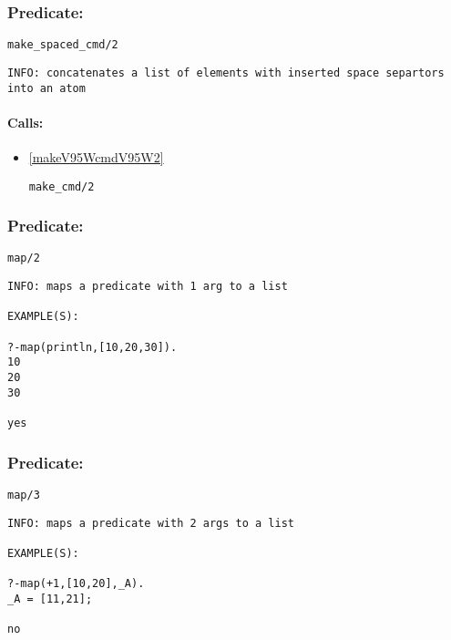 \subsubsection{Predicate:} \label{makeV95WspacedV95WcmdV95W2}

\begin{verbatim}
make_spaced_cmd/2
\end{verbatim}

{\small \begin{verbatim}
INFO: concatenates a list of elements with inserted space separtors into an atom

\end{verbatim}}
\paragraph{Calls:} 
\begin{itemize}
\item \ref{makeV95WcmdV95W2} 
\begin{verbatim}
make_cmd/2
\end{verbatim}

\end{itemize}

\subsubsection{Predicate:} \label{mapV95W2}

\begin{verbatim}
map/2
\end{verbatim}

{\small \begin{verbatim}
INFO: maps a predicate with 1 arg to a list

EXAMPLE(S):

?-map(println,[10,20,30]).
10
20
30

yes

\end{verbatim}}

\subsubsection{Predicate:} \label{mapV95W3}

\begin{verbatim}
map/3
\end{verbatim}

{\small \begin{verbatim}
INFO: maps a predicate with 2 args to a list

EXAMPLE(S):

?-map(+1,[10,20],_A).
_A = [11,21];

no

\end{verbatim}}

